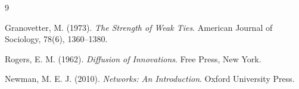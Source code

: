 \documentclass[12pt, a4paper]{article}
\begin{document}
\begin{thebibliography}{9}

Granovetter, M. (1973).
\textit{The Strength of Weak Ties}.
American Journal of Sociology, 78(6), 1360--1380.

Rogers, E. M. (1962).
\textit{Diffusion of Innovations}.
Free Press, New York.

Newman, M. E. J. (2010).
\textit{Networks: An Introduction}.
Oxford University Press.

\end{thebibliography}
\end{document}

